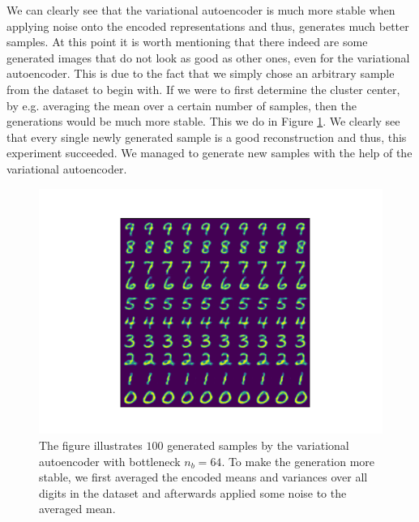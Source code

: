 We can clearly see that the variational autoencoder is much more stable when applying noise onto the encoded representations and thus, generates much better samples. At this point it is worth mentioning that there indeed are some generated images that do not look as good as other ones, even for the variational autoencoder. This is due to the fact that we simply chose an arbitrary sample from the dataset to begin with. If we were to first determine the cluster center, by e.g. averaging the mean over a certain number of samples, then the generations would be much more stable. This we do in Figure \ref{fig:convolutional_VAE_better_generations}. We clearly see that every single newly generated sample is a good reconstruction and thus, this experiment succeeded. We managed to generate new samples with the help of the variational autoencoder.


\begin{figure}
\begin{center}
   \begin{minipage}[b]{0.60\linewidth}
      \includegraphics[trim = 15mm 10mm 15mm 10mm, clip, width=\linewidth]{convolutional_VAE_snd_KL_4e-5_10k_epochs_64D_generated_optimal}
	\end{minipage}
\end{center}
\caption{The figure illustrates $100$ generated samples by the variational autoencoder with bottleneck $n_b=64$. To make the generation more stable, we first averaged the encoded means and variances over all digits in the dataset and afterwards applied some noise to the averaged mean.}\label{fig:convolutional_VAE_better_generations}
\end{figure}


